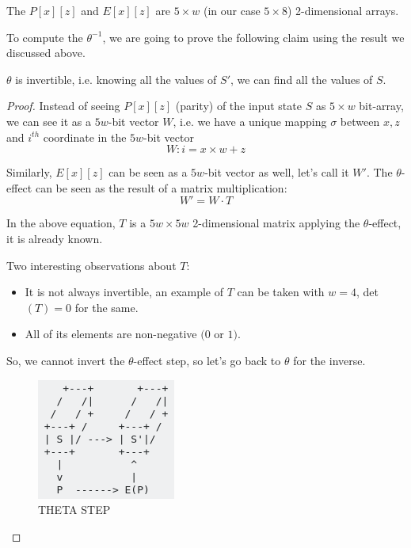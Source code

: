\documentclass[10pt,twoside]{article}
\begin{document}
The $P[x][z]$ and $E[x][z]$ are $5\times w$ (in our case $5\times 8$) 2-dimensional arrays. \newline

To compute the $\theta^{-1}$, we are going to prove the following claim using the result we discussed above.

\begin{claim}
  $\theta$ is invertible, i.e. knowing all the values of $S'$, we can find all the values of $S$.
\end{claim}

\begin{proof}
  Instead of seeing $P[x][z]$ (parity) of the input state $S$ as $5\times w$ bit-array, we can see it as a $5w$-bit vector $W$, i.e. we have a unique mapping $\sigma$ between $x,z$ and $i^{th}$ coordinate in the $5w$-bit vector $$W: i = x\times w + z$$

  Similarly, $E[x][z]$ can be seen as a $5w$-bit vector as well, let's call it $W'$. \newline
  The $\theta$-effect can be seen as the result of a matrix multiplication:
  \begin{equation}
    W' = W\cdot T \label{th:4}
  \end{equation}

  In the above equation, $T$ is a $5w\times 5w$ 2-dimensional matrix applying the $\theta$-effect, it is already known. \newline

  Two interesting observations about $T$:
  \begin{itemize}
    \setlength\itemsep{0em}
    \item It is not always invertible, an example of $T$ can be taken with $w=4$, det$(T)=0$ for the same.
    \item All of its elements are non-negative $(0$ or $1)$.
  \end{itemize}

  So, we cannot invert the $\theta$-effect step, so let's go back to $\theta$ for the inverse.

  \begin{figure}[h]
      \includegraphics[scale=0.8]{images/theta.png}
      \centering
      \caption{THETA STEP}
      \label{theta}
  \end{figure}


\end{proof}
\end{document}

